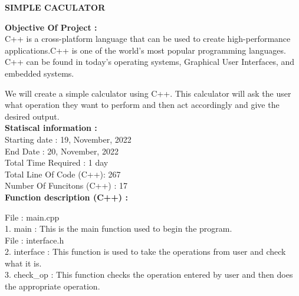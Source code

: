 \documentclass{article}
\begin{document}
\pagebreak
\begin{center}{\centering \large{\textbf{\bf SIMPLE CACULATOR\\}}}\end{center}

\textbf{\bf Objective Of Project : \\}
C++ is a cross-platform language that can be used to create high-performance applications.C++ is one of the world's most popular programming languages. C++ can be found in today's operating systems, Graphical User Interfaces, and embedded systems.\par We will create a simple calculator using C++. This calculator will ask the user what operation they want to perform and then act accordingly and give the desired output.\\

\textbf{\bf Statiscal information : \\}
Starting date : 19, November, 2022\\
End Date : 20, November, 2022\\
Total Time Required : 1 day\\
Total Line Of Code (C++): 267 \\
Number Of Funcitons (C++) : 17 \\

\textbf{\bf Function description (C++) : \\}

File : main.cpp\\
1. main : This is the main function used to begin the program.\\

File : interface.h\\
2. interface : This function is used to take the operations from user and check what it is.\\
3. check\_op : This function checks the operation entered by user and then does the appropriate operation.\\
\end{document}
